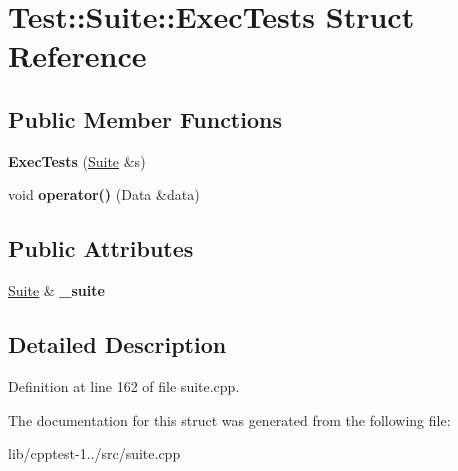 \hypertarget{struct_test_1_1_suite_1_1_exec_tests}{}\section{Test\+:\+:Suite\+:\+:Exec\+Tests Struct Reference}
\label{struct_test_1_1_suite_1_1_exec_tests}
\subsection*{Public Member Functions}
\begin{DoxyCompactItemize}
\item 
{\bfseries Exec\+Tests} (\hyperlink{class_test_1_1_suite}{Suite} \&s)\hypertarget{struct_test_1_1_suite_1_1_exec_tests_a49e123e603aa95feae5e83e1754c4676}{}\label{struct_test_1_1_suite_1_1_exec_tests_a49e123e603aa95feae5e83e1754c4676}

\item 
void {\bfseries operator()} (Data \&data)\hypertarget{struct_test_1_1_suite_1_1_exec_tests_acfc10f09bd6c369114202742d098ff10}{}\label{struct_test_1_1_suite_1_1_exec_tests_acfc10f09bd6c369114202742d098ff10}

\end{DoxyCompactItemize}
\subsection*{Public Attributes}
\begin{DoxyCompactItemize}
\item 
\hyperlink{class_test_1_1_suite}{Suite} \& {\bfseries \+\_\+suite}\hypertarget{struct_test_1_1_suite_1_1_exec_tests_ab0bf7c14d635c9c2da8546c6a57b05f3}{}\label{struct_test_1_1_suite_1_1_exec_tests_ab0bf7c14d635c9c2da8546c6a57b05f3}

\end{DoxyCompactItemize}


\subsection{Detailed Description}


Definition at line 162 of file suite.\+cpp.



The documentation for this struct was generated from the following file\+:\begin{DoxyCompactItemize}
\item 
lib/cpptest-\/1../src/suite.\+cpp\end{DoxyCompactItemize}
